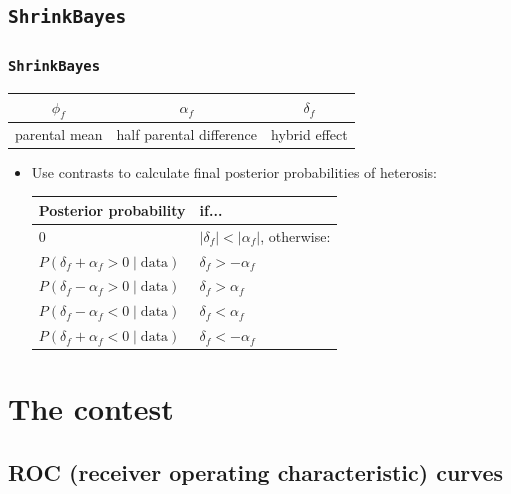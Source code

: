 \documentclass[handout]{beamer}
\numberwithin{equation}{section}
\begin{document}
\subsection{{\tt ShrinkBayes}}

\begin{frame}
\frametitle{{\tt ShrinkBayes}}


\begin{center}
\begin{tabular}{c|c|c}
$\phi_f$ & $\alpha_f$ & $\delta_f$ \\ \hline
parental mean & half parental difference & hybrid effect
\end{tabular}
\end{center}
\normalsize

\begin{itemize}
\item Use contrasts to calculate final posterior probabilities of heterosis:

\begin{center}
\begin{tabular}{l|l}
Posterior probability & if... \\ \hline
0 & $|\delta_f| < |\alpha_f|$, otherwise: \\
$P(\delta_f + \alpha_f > 0 \mid \text{data})$ & $\delta_f > -\alpha_f$ \\
$P(\delta_f - \alpha_f > 0 \mid \text{data})$ & $\delta_f > \alpha_f$ \\
$P(\delta_f - \alpha_f < 0 \mid \text{data})$ & $\delta_f < \alpha_f$ \\
$P(\delta_f + \alpha_f < 0 \mid \text{data})$ & $\delta_f < -\alpha_f$ \\
\end{tabular}
\end{center}

\end{itemize}
\end{frame}

\section{The contest}

\subsection{ROC (receiver operating characteristic) curves}
\end{document}
